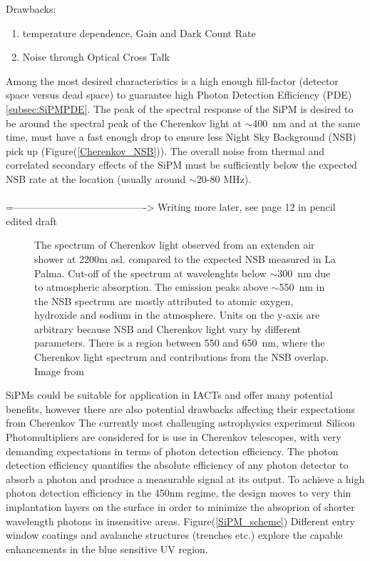 \documentclass[12pt,article,type=msc,colorback,accentcolor=tud9c]{tudthesis}
\begin{document}
\noindent
Drawbacks:
\begin{enumerate}[topsep=0pt,itemsep=-1ex,partopsep=1ex,parsep=1ex]
\item temperature dependence, Gain and Dark Count Rate
\item Noise through Optical Cross Talk
\end{enumerate}
\noindent
\newline

Among the most desired characteristics is a high enough fill-factor (detector space versus dead space) to guarantee high Photon Detection Efficiency (PDE) \ref{subsec:SiPMPDE}. The peak of the spectral response of the SiPM is desired to be around the spectral peak of the Cherenkov light at $\sim$400~nm and at the same time, must have a fast enough drop to ensure less Night Sky Background (NSB) pick up (Figure(\ref{Cherenkov_NSB})). The overall noise from thermal and correlated secondary effects of the SiPM must be sufficiently below the expected NSB rate at the location (usually around $\sim$20-80 MHz).\\\\


=---------------------------------------->
Writing more later, see page 12 in pencil edited draft



\begin{figure}[t]
\begin{centering}
\caption{The spectrum of Cherenkov light observed from an extenden air shower at 2200m asl. compared to the expected NSB measured in La Palma. Cut-off of the spectrum at wavelenghts below $\sim$300~nm due to atmospheric absorption. The emission peaks above $\sim$550~nm in the NSB spectrum are mostly attributed to atomic oxygen, hydroxide and sodium in the atmosphere. Units on the y-axis are arbitrary because NSB and Cherenkov light vary by different parameters. There is a region between 550 and 650~nm, where the Cherenkov light spectrum and contributions from the NSB overlap. Image from \cite{SiPMvsMAPMT}}
\label{fig:Cherenkov_NSB}
\end{centering}
\end{figure}

SiPMs could be suitable for application in IACTs and offer many potential benefits, however there are also potential drawbacks affecting their expectations from Cherenkov
The currently most challenging astrophysics experiment Silicon Photomultipliers are considered for is use in Cherenkov telescopes, with very demanding expectations in terms of photon detection efficiency. The photon detection efficiency quantifies the absolute efficiency of any photon detector to absorb a photon and produce a measurable signal at its output. To achieve a high photon detection efficiency in the 450nm regime, the design moves to very thin implantation layers on the surface in order to minimize the absoprion of shorter wavelength photons in insensitive areas. Figure(\ref{SiPM_scheme}) Different entry window coatings and avalanche structures (trenches etc.) explore the capable enhancements in the blue sensitive UV region.
\end{document}
